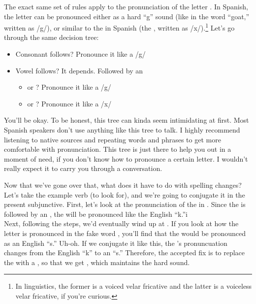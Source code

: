 The exact same set of rules apply to the pronunciation of the letter . In Spanish, the letter  can be pronounced either as a hard ``g'' sound (like in the word ``goat,'' written as /g/), or similar to the  in Spanish (the , written as /x/).\footnote{In linguistics, the former is a voiced velar fricative and the latter is a voiceless velar fricative, if you're curious.} Let's go through the same decision tree: 
\begin{itemize}[noitemsep]
	\item Consonant follows? Pronounce it like a /g/ 
	\item Vowel follows? It depends. Followed by an 
		\begin{itemize}[noitemsep]
			\item {} or ? Pronounce it like a /g/
			\item {} or ? Pronounce it like a /x/
		\end{itemize}
\end{itemize}

\begin{conf}{You'll be okay. }
To be honest, this tree can kinda seem intimidating at first. Most Spanish speakers don't use anything like this tree to talk. I highly recommend listening to native sources and repeating words and phrases to get more comfortable with pronunciation. This tree is just there to help you out in a moment of need, if you don't know how to pronounce a certain letter. I wouldn't really expect it to carry you through a conversation.
\end{conf}

Now that we've gone over that, what does it have to do with spelling changes?\\

Let's take the example verb  (to look for), and we're going to conjugate it in the present subjunctive. 
First, let's look at the pronunciation of the  in . Since the  is followed by an , the  will be pronounced like the English ``k.''i\\

Next, following the steps, we'd eventually wind up at \sout{}. If you look at how the letter  is pronounced in the fake word \sout{}, you'll find that the  would be pronounced as an English ``s.'' Uh-oh. If we conjugate it like this, the 's pronuncuation changes from the English ``k'' to an ``s.'' Therefore, the accepted fix is to replace the  with a , so that we get , which maintains the hard  sound. \\

